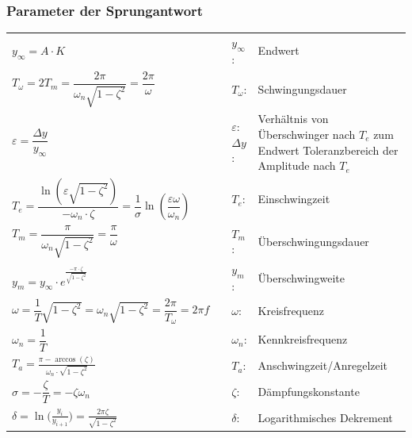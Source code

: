 	\subsubsection{Parameter der Sprungantwort}
    \renewcommand{\arraystretch}{1.8}
    \begin{tabular}{|m{7cm}|m{1cm}m{0.5cm}m{8cm}}
      \cline{1-1}
      $y_{\infty} =A \cdot K$ & &
      $y_{\infty}$: & Endwert\\
      \cline{1-1}  
        $T_\omega = 2T_m=\dfrac{2\pi}{\omega_n \sqrt{1-\zeta^2}}=\dfrac{2\pi}{\omega}$ & &
        $T_{\omega}$: & Schwingungsdauer \\
      \cline{1-1}
      	$\varepsilon = \dfrac{\Delta y}{y_{\infty}}$ & &
      	\parbox{0.5cm}{
      		$\varepsilon$:\\
      		$\Delta y$:
      	} & 
      	\parbox{8cm}{
      		Verhältnis von Überschwinger nach $T_e$ zum Endwert\\
      		Toleranzbereich der Amplitude nach $T_e$
      	}\\
        $T_e = \dfrac{\ln\left(\varepsilon\sqrt{1-\zeta^2}\right)}{-\omega_n\cdot\zeta} = 
        \dfrac{1}{\sigma}\ln\left(\dfrac{\varepsilon\omega}{\omega_n}\right)$ & &
        $T_e$: & Einschwingzeit \\
        $T_m = \dfrac{\pi}{\omega_n\sqrt{1-\zeta^2}}=\dfrac{\pi}{\omega}$ & &
        $T_m$: & Überschwingungsdauer\\
      	$y_m = y_{\infty} \cdot e^{\frac{-\pi\cdot\zeta}{\sqrt{1-\zeta^2}}}$ & &
        $y_m$: & Überschwingweite\\
        $\omega = \dfrac{1}{T}\sqrt{1-\zeta^2}= \omega_n\sqrt{1-\zeta^2}=\dfrac{2\pi}{T_\omega}=2\pi f$ & &
        $\omega$: & Kreisfrequenz \\
        $\omega_n = \dfrac{1}{T}$ & &
        $\omega_n$: & Kennkreisfrequenz \\
        $T_a = \frac{\pi - \arccos{(\zeta)}}{\omega_n\cdot\sqrt{1-\zeta^2}}$ & &
        $T_a$: & Anschwingzeit/Anregelzeit \\
        $\sigma = -\dfrac{\zeta}{T} = -\zeta\omega_n$ & &
        $\zeta$: & Dämpfungskonstante \\
      	$\delta = \ln{\Big(\frac{y_i}{y_{i+1}}\Big)} = \frac{2\pi \zeta}{\sqrt{1-\zeta^2}}$ & &
        $\delta$: & Logarithmisches Dekrement\\
    \end{tabular}
    \renewcommand{\arraystretch}{1}
	
